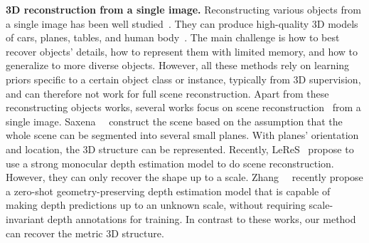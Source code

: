 \noindent\textbf{3D reconstruction from a single image.} 
Reconstructing various objects from a single image has been well studied~\cite{barron2014shape, wang2018pixel2mesh, wu2018learning}. They can produce high-quality 3D models of cars, planes, tables, and human body~\cite{saito2019pifu, saito2020pifuhd}. The main challenge is how to best recover objects' details, how to represent them with limited memory, and how to generalize to more diverse objects. However, all these methods rely on learning priors specific to a certain object class or instance, typically from 3D supervision, and can therefore not work for full scene reconstruction. Apart from these reconstructing objects works, several works focus on scene reconstruction~\cite{Xu_2023_ICCV} from a single image. Saxena~\etal~\cite{saxena2008make3d} construct the scene based on the assumption that the whole scene can be segmented into several small planes. With planes' orientation and location, the 3D structure can be represented. Recently, LeReS~\cite{leres} propose to use a strong monocular depth estimation model to do scene reconstruction. However, they can only recover the shape up to a scale. 
Zhang~\etal~\cite{Zhang_2023_ICCV} recently  propose a zero-shot geometry-preserving depth estimation model that is capable of making depth predictions up to an unknown scale, without requiring  scale-invariant depth annotations for training. 
In contrast to these works, our method can recover the metric 3D structure.



